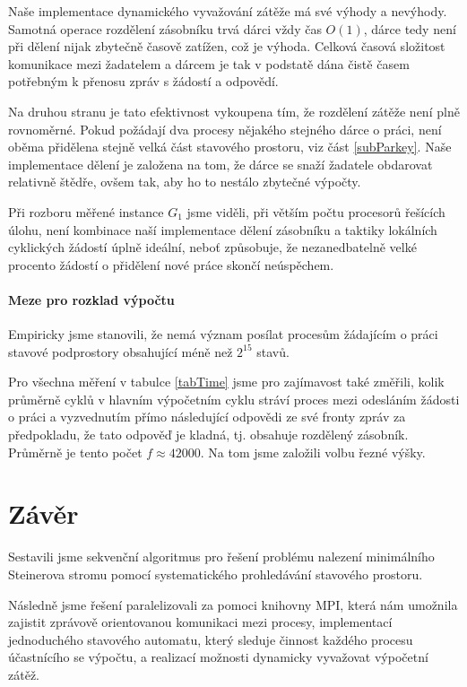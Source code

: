 \documentclass[12pt]{article}
\theoremstyle{definition}
\begin{document}
Naše implementace dynamického vyvažování zátěže má své výhody a nevýhody. Samotná operace rozdělení
zásobníku trvá dárci vždy čas $O(1)$, dárce tedy není při dělení nijak zbytečně časově zatížen, což je výhoda.
Celková časová složitost komunikace mezi žadatelem a dárcem je tak v podstatě dána čistě časem potřebným k přenosu
zpráv s žádostí a odpovědí.

Na druhou stranu je tato efektivnost vykoupena tím, že rozdělení zátěže není plně rovnoměrné. Pokud požádají
dva procesy nějakého stejného dárce o práci, není oběma přidělena stejně velká část stavového prostoru, viz část \ref{subParkey}.
Naše implementace dělení je založena na tom, že dárce se snaží žadatele obdarovat relativně štědře, ovšem tak, aby ho to nestálo
zbytečné výpočty.

Při rozboru měřené instance $G_1$ jsme viděli, při větším počtu procesorů řešících úlohu, není kombinace naší
implementace dělení zásobníku a taktiky lokálních cyklických žádostí úplně ideální, neboť způsobuje, že nezanedbatelně
velké procento žádostí o přidělení nové práce skončí neúspěchem.

\paragraph{Meze pro rozklad výpočtu}\mbox{}\newline
Empiricky jsme stanovili, že nemá význam posílat procesům žádajícím o práci stavové podprostory
obsahující méně než $2^{15}$ stavů.

Pro všechna měření v tabulce \ref{tabTime} jsme pro zajímavost také změřili, kolik průměrně cyklů v hlavním
výpočetním cyklu stráví proces mezi odesláním žádosti o práci a vyzvednutím přímo následující odpovědi ze své fronty zpráv za předpokladu,
že tato odpověď je kladná, tj. obsahuje rozdělený zásobník. Průměrně je tento počet $f\approx 42000$. Na tom jsme založili volbu řezné výšky. 

\section{Závěr}
Sestavili jsme sekvenční algoritmus pro řešení problému nalezení minimálního Steinerova stromu
pomocí systematického prohledávání stavového prostoru.

Následně jsme řešení paralelizovali za pomoci knihovny MPI, která nám umožnila
zajistit zprávově orientovanou komunikaci mezi procesy, implementací jednoduchého
stavového automatu, který sleduje činnost každého procesu účastnícího se výpočtu, a 
realizací možnosti dynamicky vyvažovat výpočetní zátěž.
\end{document}
